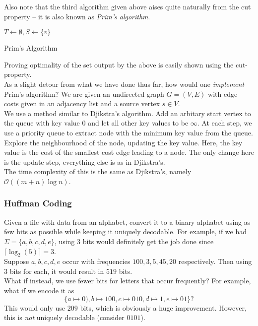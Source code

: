 Also note that the third algorithm given above aises quite naturally from the cut property -- it is also known as \textit{Prim's algorithm}.

\begin{algorithm}
	\DontPrintSemicolon
	\SetNoFillComment
	$T\gets\emptyset, S\gets\{v\}$ 
	\caption{Prim's Algorithm}\label{algo: prim's algorithm}
\end{algorithm}

Proving optimality of the set output by the above is easily shown using the cut-property.\\

As a slight detour from what we have done thus far, how would one \textit{implement} Prim's algorithm? We are given an undirected graph $G=(V,E)$ with edge costs given in an adjacency list and a source vertex $s\in V$.\\
We use a method similar to Djikstra's algorithm. Add an arbitary start vertex to the queue with key value $0$ and let all other key values to be $\infty$. At each step, we use a priority queue to extract node with the minimum key value from the queue. Explore the neighbourhood of the node, updating the key value. Here, the key value is the cost of the smallest cost edge leading to a node. The only change here is the update step, everything else is as in Djikstra's.\\
The time complexity of this is the same as Djikstra's, namely $\mathcal{O}((m+n)\log n)$.

\subsubsection{Huffman Coding}

Given a file with data from an alphabet, convert it to a binary alphabet using as few bits as possible while keeping it uniquely decodable. For example, if we had $\Sigma=\{a,b,c,d,e\}$, using $3$ bits would definitely get the job done since $\lceil \log_2(5)\rceil = 3$.\\
Suppose $a,b,c,d,e$ occur with frequencies $100,3,5,45,20$ respectively. Then using $3$ bits for each, it would result in $519$ bits.\\
What if instead, we use fewer bits for letters that occur frequently? For example, what if we encode it as
\[ \{a\mapsto 0),b\mapsto 100,c\mapsto 010,d\mapsto 1,e\mapsto 01\}? \] This would only use $209$ bits, which is obviously a huge improvement. However, this is \textit{not} uniquely decodable (consider $0101$).\\


